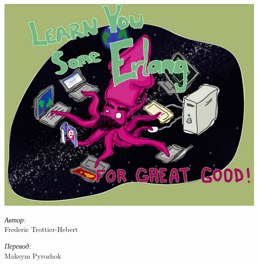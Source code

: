 \documentclass[a4paper,12pt]{report}
\begin{document}
\begin{titlepage}
    \begin{center}
        \includegraphics[width=1\textwidth]{title.png}
        \\[5cm]
        \begin{minipage}{0.4\textwidth}
            \begin{flushleft}
                \emph{Автор:}\large\\
                 Frederic Trottier-Hebert
            \end{flushleft}
        \end{minipage}
        \begin{minipage}{0.4\textwidth}
            \begin{flushright}
                \emph{Перевод:}\\
                Maksym Pyrozhok
            \end{flushright}
        \end{minipage}
        \vfill
    \end{center}
\end{titlepage}












\end{document}
